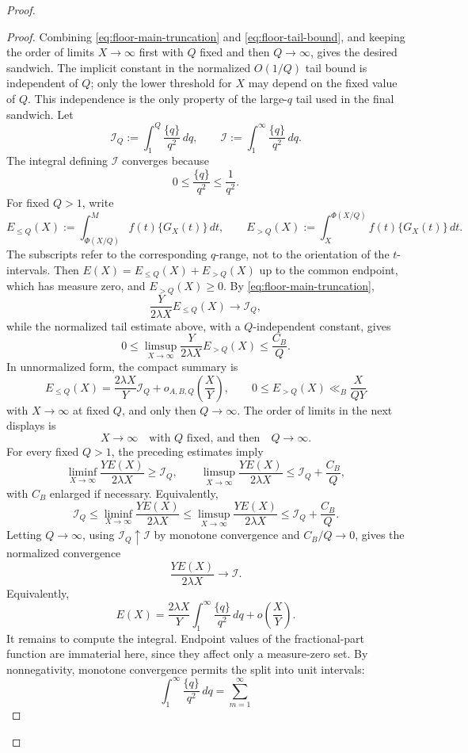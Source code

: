 \documentclass[11pt]{article}
\begin{document}
\begin{proof}
\begin{proof}
Combining \eqref{eq:floor-main-truncation} and \eqref{eq:floor-tail-bound}, and keeping the order
of limits $X\to\infty$ first with $Q$ fixed and then $Q\to\infty$, gives the desired sandwich.
The implicit constant in the normalized $O(1/Q)$ tail bound is independent of $Q$; only the lower
threshold for $X$ may depend on the fixed value of $Q$. This independence is the only property of
the large-$q$ tail used in the final sandwich. Let
\[
\mathcal I_Q:=\int_1^Q\frac{\{q\}}{q^2}\,dq,
\qquad
\mathcal I:=\int_1^\infty\frac{\{q\}}{q^2}\,dq.
\]
The integral defining $\mathcal I$ converges because
\[
0\le\frac{\{q\}}{q^2}\le\frac1{q^2}.
\]
For fixed $Q>1$, write
\[
E_{\le Q}(X):=\int_{\Phi(X/Q)}^M f(t)\{G_X(t)\}\,dt,
\qquad
E_{>Q}(X):=\int_X^{\Phi(X/Q)} f(t)\{G_X(t)\}\,dt.
\]
The subscripts refer to the corresponding $q$-range, not to the orientation of the
$t$-intervals.
Then $E(X)=E_{\le Q}(X)+E_{>Q}(X)$ up to the common endpoint, which has measure zero, and
$E_{>Q}(X)\ge0$. By \eqref{eq:floor-main-truncation},
\[
\frac{Y}{2\lambda X}E_{\le Q}(X)\to \mathcal I_Q,
\]
while the normalized tail estimate above, with a $Q$-independent constant, gives
\[
0\le \limsup_{X\to\infty}\frac{Y}{2\lambda X}E_{>Q}(X)\le\frac{C_B}{Q}.
\]
In unnormalized form, the compact summary is
\[
E_{\le Q}(X)=\frac{2\lambda X}{Y}\mathcal I_Q+o_{A,B,Q}\left(\frac X Y\right),
\qquad
0\le E_{>Q}(X)\ll_B \frac{X}{QY}
\]
with $X\to\infty$ at fixed $Q$, and only then $Q\to\infty$.
The order of limits in the next displays is
\[
X\to\infty\quad\text{with }Q\text{ fixed, and then}\quad Q\to\infty.
\]
For every fixed $Q>1$, the preceding estimates imply
\[
\liminf_{X\to\infty}
\frac{Y E(X)}{2\lambda X}
\ge \mathcal I_Q,
\qquad
\limsup_{X\to\infty}
\frac{Y E(X)}{2\lambda X}
\le \mathcal I_Q+\frac{C_B}{Q},
\]
with $C_B$ enlarged if necessary. Equivalently,
\[
\mathcal I_Q
\le
\liminf_{X\to\infty}
\frac{Y E(X)}{2\lambda X}
\le
\limsup_{X\to\infty}
\frac{Y E(X)}{2\lambda X}
\le
\mathcal I_Q+\frac{C_B}{Q}.
\]
Letting $Q\to\infty$, using $\mathcal I_Q\uparrow \mathcal I$ by monotone
convergence and $C_B/Q\to0$, gives the normalized convergence
\[
\frac{Y E(X)}{2\lambda X}\to \mathcal I.
\]
Equivalently,
\[
E(X)
=
\frac{2\lambda X}{Y}
\int_1^\infty\frac{\{q\}}{q^2}\,dq
+
o\left(\frac X Y\right).
\tag{41}\label{eq:E-asymptotic}
\]
It remains to compute the integral. Endpoint values of the fractional-part function are
immaterial here, since they affect only a measure-zero set. By nonnegativity, monotone
convergence permits the split into unit intervals:
\[
\int_1^\infty\frac{\{q\}}{q^2}\,dq
=
\sum_{m=1}^\infty
\]
\end{proof}
\end{proof}
\end{document}
